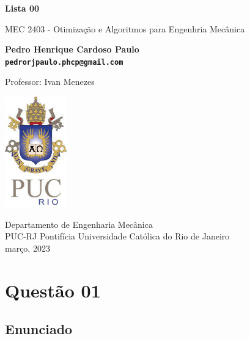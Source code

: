 \documentclass[10pt, a4paper]{article}
\begin{document}
\begin{titlepage}
      \begin{center}
          \vspace*{1cm}

          \Huge
          \textbf{Lista 00}

          \vspace{0.5cm}
          \LARGE
          MEC 2403 - Otimização e Algoritmos para Engenhria Mecânica

          \vspace{1.5cm}

          \textbf{Pedro Henrique Cardoso Paulo \\ {\tt pedrorjpaulo.phcp@gmail.com}}

          \vfill
          Professor: Ivan Menezes

          \vspace{0.8cm}

          \includegraphics[width=0.2\textwidth]{../general/puc.jpg}

          \Large
          Departamento de Engenharia Mecânica\\
          PUC-RJ Pontifícia Universidade Católica do Rio de Janeiro\\
          março, 2023

      \end{center}
  \end{titlepage}


\section[q01]{Questão 01}

\subsection[q01:enunciado]{Enunciado}
\end{document}

